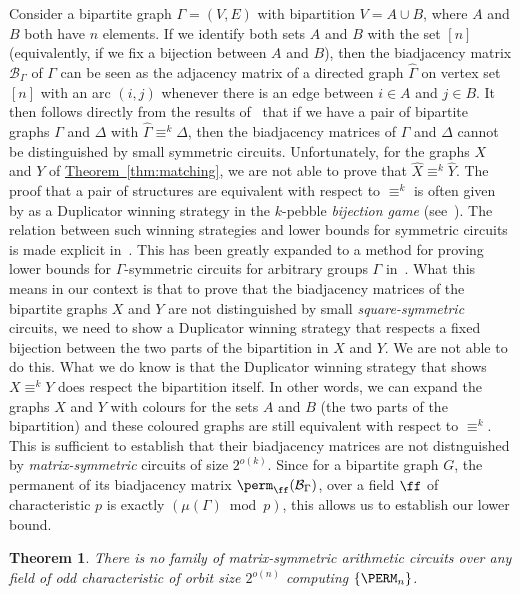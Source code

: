 \documentclass[11pt]{article}
\newcommand{\expref}[2]{\texorpdfstring{\hyperref[#2]{#1~\ref{#2}}}{#1~\ref{#2}}}
\newtheorem{theorem}{Theorem}[section]
\begin{document}
Consider a bipartite graph $\Gamma= (V,E)$ with bipartition $V= A \cup B$,
where $A$ and $B$ both have $n$ elements.  If we identify both sets
$A$ and $B$ with the set $[n]$ (equivalently, if we fix a bijection
between $A$ and $B$), then the biadjacency matrix $\mathcal{B}_\Gamma$ of
$\Gamma$ can be seen as the adjacency matrix of a directed graph $\hat{\Gamma}$
on vertex set $[n]$ with an arc $(i,j)$ whenever there is an edge
between $i \in A$ and $j \in B$.  It then follows directly from the
results of~\cite{AndersonD17} that if we have a pair of bipartite graphs $\Gamma$ and $\Delta$ with $\hat{\Gamma} \equiv^k \hat{\Delta}$, then the biadjacency matrices of $\Gamma$ and $\Delta$ cannot be distinguished by small symmetric circuits.  Unfortunately, for the graphs $X$ and $Y$ of \expref{Theorem}{thm:matching}, we are not able to prove that $\hat{X} \equiv^k \hat{Y}$. 
The proof that a pair of structures are equivalent with respect to $\equiv^k$ is often given by as a Duplicator winning strategy in the $k$-pebble \emph{bijection game} (see~\cite{DR07}).  The relation between such winning strategies and lower bounds for symmetric circuits is made explicit in~\cite{Dawar2016}.  This has been greatly expanded to a method for proving  lower bounds for $\Gamma$-symmetric circuits for arbitrary groups $\Gamma$ in~\cite{DWitcs22}.  What this means in our context is that to prove that the biadjacency matrices of the bipartite graphs $X$ and $Y$ are not distinguished by small
\emph{square-symmetric} %
circuits, we need to show a Duplicator winning strategy that respects a fixed bijection between the two parts of the bipartition in $X$ and $Y$.  We are not able to do this.  What we do know is that the Duplicator winning strategy that shows $X \equiv^k Y$ does respect the bipartition itself.  In other words, we can expand the graphs $X$ and $Y$ with colours for the sets $A$ and $B$ (the two parts of the bipartition) and these coloured graphs are still equivalent with respect to  $\equiv^k$.  This is sufficient to establish that their biadjacency matrices are not distnguished by \emph{matrix-symmetric} circuits of size $2^{o(k)}$.  Since for a bipartite graph $G$, the permanent of its biadjacency matrix $\perm_{\ff}(\mathcal{B}_\Gamma)$, over a field $\ff$ of characteristic $p$ is exactly $(\mu(\Gamma) \bmod p)$, this allows us to establish our lower bound.
\begin{theorem}\label{thm:lowerbound-matrix}
  There is no family of matrix-symmetric arithmetic circuits over any field of
  odd characteristic of orbit size $2^{o(n)}$ computing
  $\{\PERM_n\}$.
\end{theorem}
\end{document}
